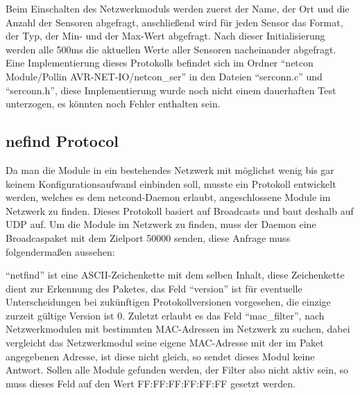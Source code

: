 \documentclass[a4paper,14pt,headsepline]{scrartcl}
\begin{document}
Beim Einschalten des Netzwerkmoduls werden zuerst der Name, der Ort und die Anzahl der Sensoren abgefragt, anschließend wird für jeden Sensor das Format, der Typ, der Min- und der Max-Wert abgefragt. Nach dieser Initialisierung werden alle 500ms die aktuellen Werte aller Sensoren nacheinander abgefragt. Eine Implementierung dieses Protokolls befindet sich im Ordner "`netcon Module/Pollin AVR-NET-IO/netcon\_ser"' in den Dateien "`serconn.c"' und "`serconn.h"', diese Implementierung wurde noch nicht einem dauerhaften Test unterzogen, es könnten noch Fehler enthalten sein.

\newpage

\subsection{nefind Protocol}
Da man die Module in ein bestehendes Netzwerk mit möglichst wenig bis gar keinem Konfigurationsaufwand einbinden soll, musste ein Protokoll entwickelt werden, welches es dem netcond-Daemon erlaubt, angeschlossene Module im Netzwerk zu finden. Dieses Protokoll basiert auf Broadcasts und baut deshalb auf UDP auf. Um die Module im Netzwerk zu finden, muss der Daemon eine Broadcaspaket mit dem Zielport 50000 senden, diese Anfrage muss folgendermaßen aussehen:
\begin{figure}[h]
\begin{center}
\end{center}
\end{figure}

"`netfind"' ist eine ASCII-Zeichenkette mit dem selben Inhalt, diese Zeichenkette dient zur Erkennung des Paketes, das Feld "`version"' ist für eventuelle Unterscheidungen bei zukünftigen Protokollversionen vorgesehen, die einzige zurzeit gültige Version ist 0. Zuletzt erlaubt es das Feld "`mac\_filter"', nach Netzwerkmodulen mit bestimmten MAC-Adressen im Netzwerk zu suchen, dabei vergleicht das Netzwerkmodul seine eigene MAC-Adresse mit der im Paket angegebenen Adresse, ist diese nicht gleich, so sendet dieses Modul keine Antwort. Sollen alle Module gefunden werden, der Filter also nicht aktiv sein, so muss dieses Feld auf den Wert FF:FF:FF:FF:FF:FF gesetzt werden.
\end{document}
